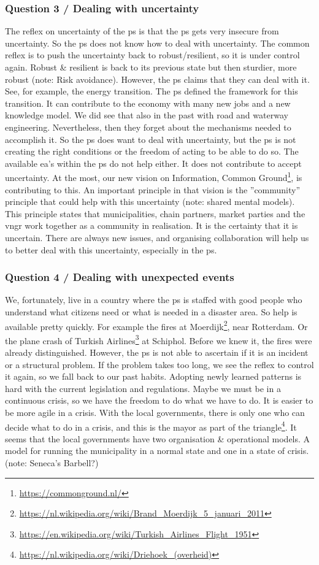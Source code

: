 \subsubsection{Question 3 / Dealing with uncertainty}
The reflex on \gls{uncertainty} of the \gls{ps} is that the \gls{ps} gets very insecure from \gls{uncertainty}. So the \gls{ps} does not know how to deal with \gls{uncertainty}. The common reflex is to push the uncertainty back to robust/resilient, so it is under control again. Robust \& resilient is back to its previous state but then sturdier, more robust (note: Risk avoidance). However, the \gls{ps} claims that they can deal with it. See, for example, the energy transition. The \gls{ps} defined the framework for this transition. It can contribute to the economy with many new jobs and a new knowledge model. We did see that also in the past with road and waterway engineering. Nevertheless, then they forget about the mechanisms needed to accomplish it. So the \gls{ps} does want to deal with \gls{uncertainty}, but the \gls{ps} is not creating the right conditions or the freedom of acting to be able to do so.
The available \acrshort{ea}'s within the \gls{ps} do not help either. It does not contribute to accept \gls{uncertainty}. At the most, our new vision on Information, Common Ground\footnote{\url{https://commonground.nl/}}, is contributing to this. An important principle in that vision is the ''community'' principle that could help with this \gls{uncertainty} (note: shared mental models). This principle states that municipalities, chain partners, market parties and the \acrshort{vngr} work together as a community in realisation. It is the certainty that it is uncertain. There are always new issues, and organising collaboration will help us to better deal with this \gls{uncertainty}, especially in the \gls{ps}.
\subsubsection{Question 4 / Dealing with unexpected events}
We, fortunately, live in a country where the \gls{ps} is staffed with good people who understand what citizens need or what is needed in a disaster area. So help is available pretty quickly. For example the fires at Moerdijk\footnote{\url{https://nl.wikipedia.org/wiki/Brand_Moerdijk_5_januari_2011}}, near Rotterdam. Or the plane crash of Turkish Airlines\footnote{\url{https://en.wikipedia.org/wiki/Turkish_Airlines_Flight_1951}} at Schiphol. Before we knew it, the fires were already distinguished. However, the \gls{ps} is not able to ascertain if it is an incident or a structural problem. If the problem takes too long, we see the reflex to control it again, so we fall back to our past habits. Adopting newly learned patterns is hard with the current legislation and regulations. Maybe we must be in a continuous crisis, so we have the freedom to do what we have to do. It is easier to be more agile in a crisis. With the local governments, there is only one who can decide what to do in a crisis, and this is the mayor as part of the triangle\footnote{\url{https://nl.wikipedia.org/wiki/Driehoek_(overheid)}}. 
It seems that the local governments have two organisation \& operational models. A model for running the municipality in a normal state and one in a state of crisis. (note: Seneca's Barbell?)
